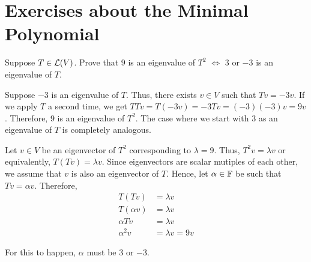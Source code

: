\section*{Exercises about the Minimal Polynomial}

\begin{xrcs}
  Suppose $T \in \mathcal{L}(V)$. Prove that $9$ is an eigenvalue of $T^2$ $\iff$ $3$ or $-3$ is an eigenvalue of $T$.
  \begin{xprf}
    \Leftarrowdirection Suppose $-3$ is an eigenvalue of $T$. Thus, there exists $v \in V$ such that $Tv = -3v$. If we apply $T$ a second time, we get $TT v = T (-3v) = -3 T v = (-3) (-3) v = 9v$. Therefore, $9$ is an eigenvalue of $T^2$. The case where we start with $3$ as an eigenvalue of $T$ is completely analogous.

    \Rightarrowdirection Let $v \in V$ be an eigenvector of $T^2$ corresponding to $\lambda = 9$. Thus, $T^2 v = \lambda v$ or equivalently, $T(Tv) = \lambda v$. Since eigenvectors are scalar mutiples of each other, we assume that $v$ is also an eigenvector of $T$. Hence, let $\alpha \in \mathbb{F}$ be such that $Tv = \alpha v$. Therefore,
    \begin{align}
      T(Tv) &= \lambda v \\
      T(\alpha v) &= \lambda v \\
      \alpha T v &= \lambda v \\
      \alpha^2 v &= \lambda v = 9v
    \end{align}

    For this to happen, $\alpha$ must be $3$ or $-3$.
  \end{xprf}
\end{xrcs}

